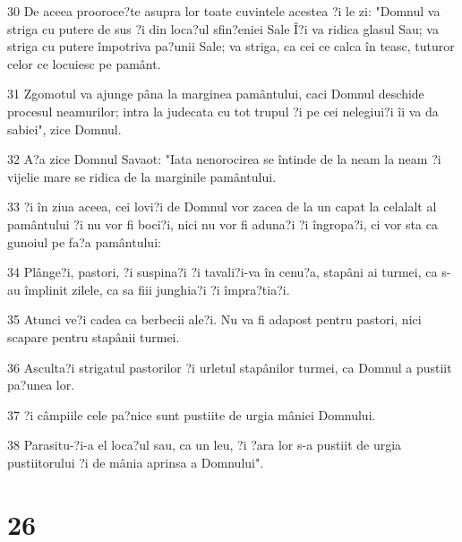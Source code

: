 \par 30 De aceea prooroce?te asupra lor toate cuvintele acestea ?i le zi: "Domnul va striga cu putere de sus ?i din loca?ul sfin?eniei Sale Î?i va ridica glasul Sau; va striga cu putere împotriva pa?unii Sale; va striga, ca cei ce calca în teasc, tuturor celor ce locuiesc pe pamânt.
\par 31 Zgomotul va ajunge pâna la marginea pamântului, caci Domnul deschide procesul neamurilor; intra la judecata cu tot trupul ?i pe cei nelegiui?i îi va da sabiei", zice Domnul.
\par 32 A?a zice Domnul Savaot: "Iata nenorocirea se întinde de la neam la neam ?i vijelie mare se ridica de la marginile pamântului.
\par 33 ?i în ziua aceea, cei lovi?i de Domnul vor zacea de la un capat la celalalt al pamântului ?i nu vor fi boci?i, nici nu vor fi aduna?i ?i îngropa?i, ci vor sta ca gunoiul pe fa?a pamântului:
\par 34 Plânge?i, pastori, ?i suspina?i ?i tavali?i-va în cenu?a, stapâni ai turmei, ca s-au împlinit zilele, ca sa fiii junghia?i ?i împra?tia?i.
\par 35 Atunci ve?i cadea ca berbecii ale?i. Nu va fi adapost pentru pastori, nici scapare pentru stapânii turmei.
\par 36 Asculta?i strigatul pastorilor ?i urletul stapânilor turmei, ca Domnul a pustiit pa?unea lor.
\par 37 ?i câmpiile cele pa?nice sunt pustiite de urgia mâniei Domnului.
\par 38 Parasitu-?i-a el loca?ul sau, ca un leu, ?i ?ara lor s-a pustiit de urgia pustiitorului ?i de mânia aprinsa a Domnului".

\chapter{26}

